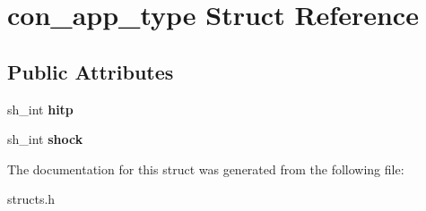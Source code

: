\hypertarget{structcon__app__type}{}\section{con\+\_\+app\+\_\+type Struct Reference}
\label{structcon__app__type}
\subsection*{Public Attributes}
\begin{DoxyCompactItemize}
\item 
\mbox{\label{structcon__app__type_a562542daceac28378c7774aad06a6c27}} 
sh\+\_\+int {\bfseries hitp}
\item 
\mbox{\label{structcon__app__type_a4b986760cfdd302e2b0667ec554318bf}} 
sh\+\_\+int {\bfseries shock}
\end{DoxyCompactItemize}


The documentation for this struct was generated from the following file\+:\begin{DoxyCompactItemize}
\item 
structs.\+h\end{DoxyCompactItemize}
